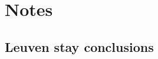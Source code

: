 \documentclass[a4paper]{article}
\begin{document}

\section{Notes}
\subsection{Leuven stay conclusions}
\end{document}
